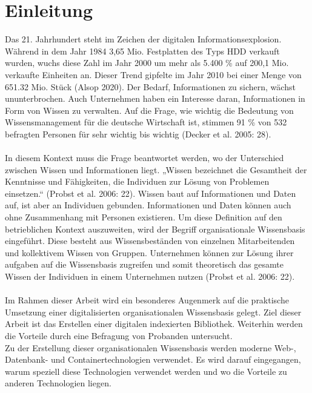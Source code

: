 \documentclass[a4paper]{scrartcl}
\begin{document}
\listoftables


\newpage

\setcounter{page}{1}


\section{Einleitung}
Das 21. Jahrhundert steht im Zeichen der digitalen Informationsexplosion. Während in dem Jahr 1984 3,65 Mio. Festplatten des Typs HDD verkauft wurden, wuchs diese Zahl im Jahr 2000 um mehr als 5.400 \% auf 200,1 Mio. verkaufte Einheiten an. Dieser Trend gipfelte im Jahr 2010 bei einer Menge von 651.32 Mio. Stück (Alsop 2020). Der Bedarf, Informationen zu sichern, wächst ununterbrochen. Auch Unternehmen haben ein Interesse daran, Informationen in Form von Wissen zu verwalten. Auf die Frage, wie wichtig die Bedeutung von Wissensmanagement für die deutsche Wirtschaft ist, stimmen 91 \% von 532 befragten Personen für sehr wichtig bis wichtig (Decker et al. 2005: 28). \\ \\
In diesem Kontext muss die Frage beantwortet werden, wo der Unterschied zwischen Wissen und Informationen liegt. „Wissen bezeichnet die Gesamtheit der Kenntnisse und Fähigkeiten, die Individuen zur Lösung von Problemen einsetzen.“ (Probst et al. 2006: 22). Wissen baut auf Informationen und Daten auf, ist aber an Individuen gebunden. Informationen und Daten können auch ohne Zusammenhang mit Personen existieren. Um diese Definition auf den betrieblichen Kontext auszuweiten, wird der Begriff organisationale Wissensbasis eingeführt. Diese besteht aus Wissensbeständen von einzelnen Mitarbeitenden und kollektivem Wissen von Gruppen. Unternehmen können zur Lösung ihrer aufgaben auf die Wissensbasis zugreifen und somit theoretisch das gesamte Wissen der Individuen in einem Unternehmen nutzen (Probst et al. 2006: 22). \\ \\
Im Rahmen dieser Arbeit wird ein besonderes Augenmerk auf die praktische Umsetzung einer digitalisierten organisationalen Wissensbasis gelegt. Ziel dieser Arbeit ist das Erstellen einer digitalen indexierten Bibliothek. Weiterhin werden die Vorteile durch eine Befragung von Probanden untersucht. \\
Zu der Erstellung dieser organisationalen Wissensbasis werden moderne Web-, Datenbank- und Containertechnologien verwendet. Es wird darauf eingegangen, warum speziell diese Technologien verwendet werden und wo die Vorteile zu anderen Technologien liegen.
\end{document}
